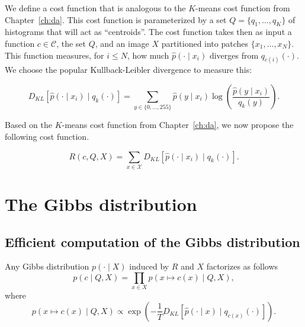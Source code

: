 We define a cost function that is analogous to the $K$-means cost function
from Chapter~\ref{ch:da}. This cost function is parameterized by a set $Q = \{q_1, \ldots, q_K\}$ of histograms that will act as ``centroids''. The cost function
takes then as input a function $c \in \mathcal{C}$, the set $Q$, and an image $X$ partitioned
into patches $\{x_1, \dots, x_N\}$. This function measures, for $i \leq N$, how much
$\hat{p}\left(\cdot \mid x_i\right)$ diverges from $q_{c(i)}\left(\cdot\right)$. We choose the popular Kullback-Leibler divergence
to measure this:

\begin{equation}
D_{KL}\left[\hat{p}\left(\cdot \mid x_i\right) \mid q_k\left(\cdot\right)\right] = \sum_{y \in \{0, \ldots, 255\}} \hat{p}\left(y \mid x_i\right) \log \left(\frac{\hat{p}\left(y \mid x_i\right)}{q_k\left(y\right)}\right).
\end{equation}

Based on the $K$-means cost function from Chapter~\ref{ch:da}, we now propose the following cost function.

\begin{definition}
\begin{equation}
R(c, Q, X) = \sum_{x \in \mathcal{X}} D_{KL}\left[\hat{p}\left(\cdot \mid x_i\right) \mid q_k\left(\cdot\right)\right].
\end{equation}
\end{definition}

\section{The Gibbs distribution}

\subsection{Efficient computation of the Gibbs distribution}

\begin{lemma}
Any Gibbs distribution $p(\cdot \mid X)$ induced by $R$ and $X$ factorizes as follows
%
\begin{equation}
p(c \mid Q, X) = \prod_{x \in X} p(x \mapsto c(x) \mid Q, X),
\end{equation}
%
where
%
\begin{equation}
p(x \mapsto c(x) \mid Q, X) \propto \exp\left(-\frac{1}{T}D_{KL}\left[\hat{p}\left(\cdot \mid x\right) \mid q_{c(x)}\left(\cdot \right)\right]\right).
\end{equation}
%
\end{lemma}

